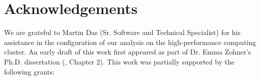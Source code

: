 \section*{Acknowledgements}
We are grateful to Martin Das (Sr. Software and Technical Specialist) for his assistance in the configuration of our analysis on the high-performance computing cluster. An early draft of this work first appeared as part of Dr. Emma Zohner's Ph.D. dissertation (\citeyear{zohner_feature_2021}, Chapter 2).
This work was partially supported by the following grants:

